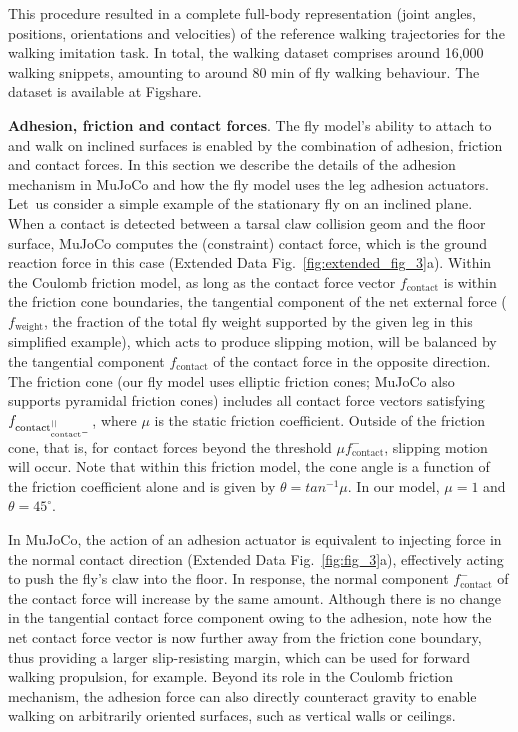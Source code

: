 \documentclass[sn-mathphys-num]{sn-jnl}%
\theoremstyle{thmstyleone}	%
\theoremstyle{thmstyletwo}	%
\theoremstyle{thmstylethree}	%
\begin{document}
This procedure resulted in a complete full-body representation (joint angles, positions, orientations and velocities) of the reference walking trajectories for the walking imitation task. 
In total, the walking dataset comprises around  16,000 walking snippets, amounting to around 80 min of fly walking behaviour.
The dataset is available at Figshare\cite{vaxenburg2025whole}.


\textbf{Adhesion, friction and contact forces}. 
The fly model's ability to attach to and walk on inclined surfaces is enabled by the combination of adhesion, friction and contact forces. 
In this section we describe the details of the adhesion mechanism in MuJoCo and how the fly model uses the leg adhesion actuators. 
Let us consider a simple example of the stationary fly on an inclined plane. 
When a contact is detected between a tarsal claw collision geom and the floor surface, MuJoCo computes the (constraint) contact force, which is the ground reaction force in this case (Extended Data Fig.~\ref{fig:extended_fig_3}a). 
Within the Coulomb friction model, as long as the contact force vector $ f_\text{contact} $ is within the friction cone boundaries, the tangential component of the net external force ($ f_\text{weight} $, the fraction of the total fly weight supported by the given leg in this simplified example), which acts to produce slipping motion, will be balanced by the tangential component $ f_\text{contact} $ of the contact force in the opposite direction. 
The friction cone (our fly model uses elliptic friction cones; 
MuJoCo also supports pyramidal friction cones) includes all contact force vectors satisfying $ f_{\text{contact}^{||} \let \mu f_{\text{contact}^{-}}} $, where $ \mu $ is the static friction coefficient.
Outside of the friction cone, that is, for contact forces beyond the threshold $ \mu f_{\text{contact}}^{-} $, slipping motion will occur.
Note that within this friction model, the cone angle is a function of the friction coefficient alone and is given by $ \theta = tan^{-1} \mu $.
In our model, $ \mu = 1 $ and $ \theta = 45^{\circ} $.


In MuJoCo, the action of an adhesion actuator is equivalent to injecting force in the normal contact direction (Extended Data Fig.~\ref{fig:fig_3}a), effectively acting to push the fly’s claw into the floor. 
In response, the normal component $ f_\text{contact}^{-} $ of the contact force will increase by the same amount. 
Although there is no change in the tangential contact force component owing to the adhesion, note how the net contact force vector is now further away from the friction cone boundary, thus providing a larger slip-resisting margin, which can be used for forward walking propulsion, for example. 
Beyond its role in the Coulomb friction mechanism, the adhesion force can also directly counteract gravity to enable walking on arbitrarily oriented surfaces, such as vertical walls or ceilings.
\end{document}
